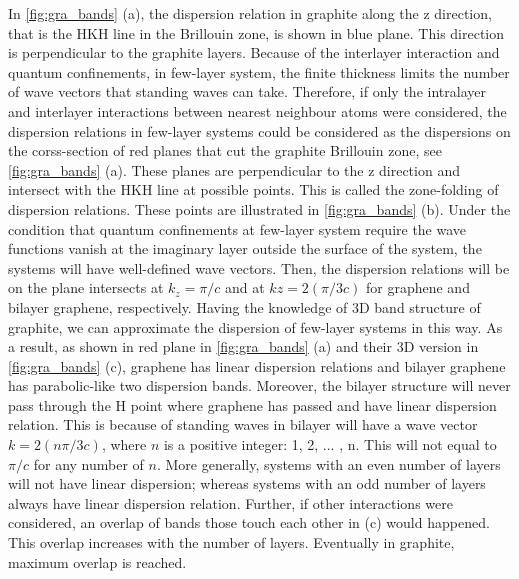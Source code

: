 In \autoref{fig:gra_bands} (a), the dispersion relation in graphite along the z direction, that is the HKH line in the Brillouin zone, is shown in blue plane. This direction is perpendicular to the graphite layers. Because of the interlayer interaction and quantum confinements, in few-layer system, the finite thickness limits the number of wave vectors that standing waves can take.  Therefore, if only the intralayer and interlayer interactions between nearest neighbour atoms were considered, the dispersion relations in few-layer systems could be considered as the dispersions on the corss-section of red planes that cut the graphite Brillouin zone, see \autoref{fig:gra_bands} (a).  These planes are perpendicular to the z direction and intersect with the HKH line at possible points. This is called the zone-folding of dispersion relations\cite{saito1998physical}. These points are illustrated in \autoref{fig:gra_bands} (b). Under the condition that quantum confinements at few-layer system require the wave functions vanish at the imaginary layer outside the surface of the system, the systems will have well-defined wave vectors. Then, the dispersion relations will be on the plane intersects at $k_z=\pi/c$ and at $kz=2(\pi/3c)$ for graphene and bilayer graphene, respectively.  Having the knowledge of 3D band structure of graphite, we can approximate the dispersion of few-layer systems in this way. As a result, as shown in red plane in \autoref{fig:gra_bands} (a) and their 3D version in \autoref{fig:gra_bands} (c), graphene has linear dispersion relations and bilayer graphene has parabolic-like two dispersion bands. Moreover, the bilayer structure will never pass through the H point where graphene has passed and have linear dispersion relation. This is because of standing waves in bilayer will have a wave vector $k=2(n \pi/3c)$, where $n$ is a positive integer: 1, 2, ... , n. This will not equal to $\pi/c$ for any number of $n$. More generally, systems with an even number of layers will not have linear dispersion; whereas systems with an odd number of layers always have linear dispersion relation. Further, if other interactions were considered, an overlap of bands those touch each other in (c) would happened\cite{Partoens2006}. This overlap increases with the number of layers. Eventually in graphite, maximum overlap is reached.


